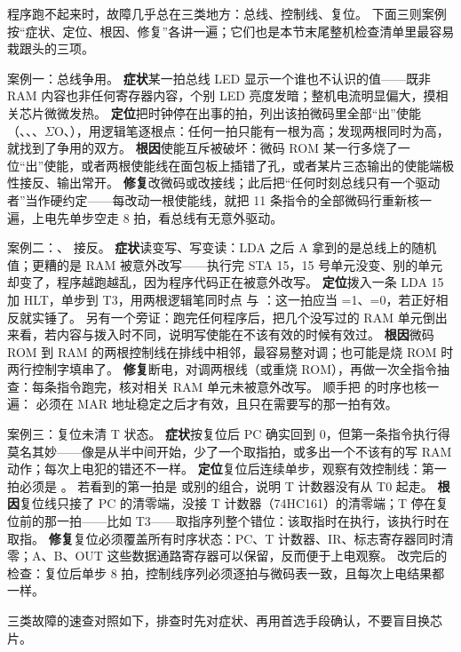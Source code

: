 程序跑不起来时，故障几乎总在三类地方：总线、控制线、复位。
下面三则案例按“症状、定位、根因、修复”各讲一遍；它们也是本节末尾整机检查清单里最容易栽跟头的三项。

案例一：总线争用。
\textbf{症状}某一拍总线 LED 显示一个谁也不认识的值——既非 RAM 内容也非任何寄存器内容，个别 LED 亮度发暗；整机电流明显偏大，摸相关芯片微微发热。
\textbf{定位}把时钟停在出事的拍，列出该拍微码里全部“出”使能（、、、$\Sigma$O、），用逻辑笔逐根点：任何一拍只能有一根为高；发现两根同时为高，就找到了争用的双方。
\textbf{根因}使能互斥被破坏：微码 ROM 某一行多烧了一位“出”使能，或者两根使能线在面包板上插错了孔，或者某片三态输出的使能端极性接反、输出常开。
\textbf{修复}改微码或改接线；此后把“任何时刻总线只有一个驱动者”当作硬约定——每改动一根使能线，就把 11 条指令的全部微码行重新核一遍，上电先单步空走 8 拍，看总线有无意外驱动。

案例二：、 接反。
\textbf{症状}读变写、写变读：LDA 之后 A 拿到的是总线上的随机值；更糟的是 RAM 被意外改写——执行完 STA 15，15 号单元没变、别的单元却变了，程序越跑越乱，因为程序代码正在被意外改写。
\textbf{定位}拨入一条 LDA 15 加 HLT，单步到 T3，用两根逻辑笔同时点  与 ：这一拍应当 =1、=0，若正好相反就实锤了。
另有一个旁证：跑完任何程序后，把几个没写过的 RAM 单元倒出来看，若内容与拨入时不同，说明写使能在不该有效的时候有效过。
\textbf{根因}微码 ROM 到 RAM 的两根控制线在排线中相邻，最容易整对调；也可能是烧 ROM 时两行控制字填串了。
\textbf{修复}断电，对调两根线（或重烧 ROM），再做一次全指令抽查：每条指令跑完，核对相关 RAM 单元未被意外改写。
顺手把  的时序也核一遍： 必须在 MAR 地址稳定之后才有效，且只在需要写的那一拍有效。

案例三：复位未清 T 状态。
\textbf{症状}按复位后 PC 确实回到 0，但第一条指令执行得莫名其妙——像是从半中间开始，少了一个取指拍，或多出一个不该有的写 RAM 动作；每次上电犯的错还不一样。
\textbf{定位}复位后连续单步，观察有效控制线：第一拍必须是 。
若看到的第一拍是  或别的组合，说明 T 计数器没有从 T0 起走。
\textbf{根因}复位线只接了 PC 的清零端，没接 T 计数器（74HC161）的清零端；T 停在复位前的那一拍——比如 T3——取指序列整个错位：该取指时在执行，该执行时在取指。
\textbf{修复}复位必须覆盖所有时序状态：PC、T 计数器、IR、标志寄存器同时清零；A、B、OUT 这些数据通路寄存器可以保留，反而便于上电观察。
改完后的检查：复位后单步 8 拍，控制线序列必须逐拍与微码表一致，且每次上电结果都一样。

三类故障的速查对照如下，排查时先对症状、再用首选手段确认，不要盲目换芯片。

